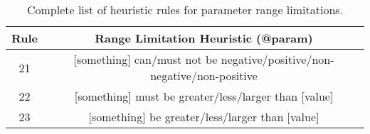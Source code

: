 \begin{table}[h]
	\centering
	\begin{tabular}{|c|c|}
		\hline
		\textbf{Rule} & \textbf{Range Limitation Heuristic (@param)} \\ \hline
		21 & [something] can/must {not} be negative/positive/non-negative/non-positive \\ \hline
		22 & [something] must be greater/less/larger than [value] \\ \hline
		23 & [something] be greater/less/larger than [value] \\ \hline
	\end{tabular}
	\caption{Complete list of heuristic rules for parameter range limitations.}
	\label{tab:complete-heuristics-range-limit-param}
\end{table}